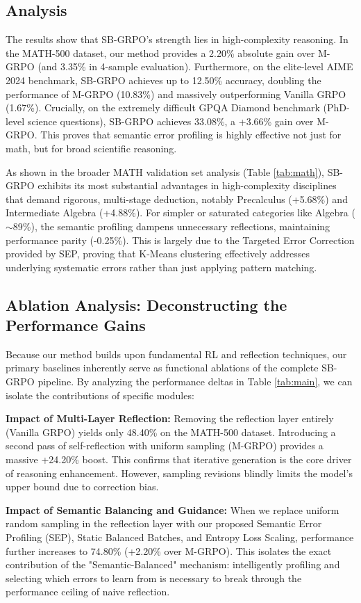 \subsection{Analysis}
The results show that SB-GRPO's strength lies in high-complexity reasoning. In the MATH-500 dataset, our method provides a 2.20\% absolute gain over M-GRPO (and 3.35\% in 4-sample evaluation). Furthermore, on the elite-level AIME 2024 benchmark, SB-GRPO achieves up to 12.50\% accuracy, doubling the performance of M-GRPO (10.83\%) and massively outperforming Vanilla GRPO (1.67\%). Crucially, on the extremely difficult GPQA Diamond benchmark (PhD-level science questions), SB-GRPO achieves 33.08\%, a +3.66\% gain over M-GRPO. This proves that semantic error profiling is highly effective not just for math, but for broad scientific reasoning.

As shown in the broader MATH validation set analysis (Table \ref{tab:math}), SB-GRPO exhibits its most substantial advantages in high-complexity disciplines that demand rigorous, multi-stage deduction, notably Precalculus (+5.68\%) and Intermediate Algebra (+4.88\%). For simpler or saturated categories like Algebra ($\sim$89\%), the semantic profiling dampens unnecessary reflections, maintaining performance parity (-0.25\%). This is largely due to the Targeted Error Correction provided by SEP, proving that K-Means clustering effectively addresses underlying systematic errors rather than just applying pattern matching.

\subsection{Ablation Analysis: Deconstructing the Performance Gains}
Because our method builds upon fundamental RL and reflection techniques, our primary baselines inherently serve as functional ablations of the complete SB-GRPO pipeline. By analyzing the performance deltas in Table \ref{tab:main}, we can isolate the contributions of specific modules:

\textbf{Impact of Multi-Layer Reflection:} Removing the reflection layer entirely (Vanilla GRPO) yields only 48.40\% on the MATH-500 dataset. Introducing a second pass of self-reflection with uniform sampling (M-GRPO) provides a massive +24.20\% boost. This confirms that iterative generation is the core driver of reasoning enhancement. However, sampling revisions blindly limits the model's upper bound due to correction bias.

\textbf{Impact of Semantic Balancing and Guidance:} When we replace uniform random sampling in the reflection layer with our proposed Semantic Error Profiling (SEP), Static Balanced Batches, and Entropy Loss Scaling, performance further increases to 74.80\% (+2.20\% over M-GRPO). This isolates the exact contribution of the "Semantic-Balanced" mechanism: intelligently profiling and selecting which errors to learn from is necessary to break through the performance ceiling of naive reflection.

